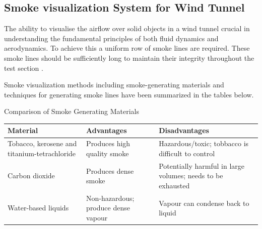 \subsection{Smoke visualization System for Wind Tunnel}
The ability to visualise the airflow over solid objects in a wind tunnel crucial in understanding the fundamental principles of both fluid dynamics and aerodynamics. To achieve this a uniform row of smoke lines are required. These smoke lines should be sufficiently long to maintain their integrity throughout
the test section \cite{trinder2013development}.

Smoke visualization methods including smoke-generating materials and techniques for generating smoke lines have been summarized in the tables below.
\begin{center}
	\begin{table}[H]
		\caption[Smoke Generating Materials]{Comparison of Smoke Generating Materials}
	\end{table}
	\begin{tabular}{|p{5cm}|p{5cm}|p{5cm}|}
		\hline
		\textbf{Material}                            & \textbf{Advantages}                 & \textbf{Disadvantages}                                      \\
		\hline
		Tobacco, kerosene and titanium-tetrachloride & Produces high quality smoke         & Hazardous/toxic; tobbacco is difficult to control           \\
		\hline
		Carbon dioxide                               & Produces dense smoke                & Potentially harmful in large volumes; needs to be exhausted \\
		\hline
		Water-based liquids                          & Non-hazardous; produce dense vapour & Vapour can condense back to liquid                          \\
		\hline
	\end{tabular}
\end{center}

